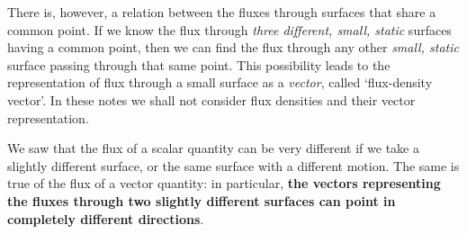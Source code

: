 \documentclass[a4paper,12pt,%
onecolumn,oneside,%
british%
]{memoir}
\renewcommand*{\|}[1][]{\nonscript\:#1\vert\nonscript\:\mathopen{}}
\begin{document}
\medskip

There is, however, a relation between the fluxes through surfaces that share a common point. If we know the flux through \emph{three different, small, static} surfaces having a common point, then we can find the flux through any other \emph{small, static} surface passing through that same point. This possibility leads to the representation of flux through a small surface as a \emph{vector}, called \enquote*{flux-density vector}. In these notes we shall not consider flux densities and their vector representation.

\medskip

We saw that the flux of a scalar quantity can be very different if we take a slightly different surface, or the same surface with a different motion. The same is true of the flux of a vector quantity: in particular, \textbf{the vectors representing the fluxes through two slightly different surfaces can point in completely different directions}.
\end{document}
